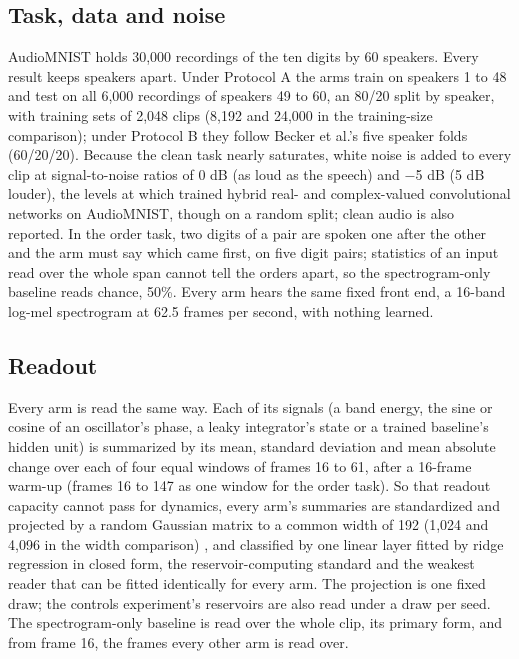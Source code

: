 \documentclass[10pt]{article}
\begin{document}
\subsection{Task, data and noise}\label{task-data-and-noise}

AudioMNIST \citep{becker2024} holds 30,000 recordings of the ten digits
by 60 speakers. Every result keeps speakers apart. Under Protocol A the
arms train on speakers 1 to 48 and test on all 6,000 recordings of
speakers 49 to 60, an 80/20 split by speaker, with training sets of
2,048 clips (8,192 and 24,000 in the training-size comparison); under
Protocol B they follow Becker et al.'s five speaker folds (60/20/20).
Because the clean task nearly saturates, white noise is added to every
clip at signal-to-noise ratios of 0 dB (as loud as the speech) and
\ensuremath{-}5 dB (5 dB louder), the levels at which \citet{young2026}
trained hybrid real- and complex-valued convolutional networks on
AudioMNIST, though on a random split; clean audio is also reported. In
the order task, two digits of a pair are spoken one after the other and
the arm must say which came first, on five digit pairs; statistics of an
input read over the whole span cannot tell the orders apart, so the
spectrogram-only baseline reads chance, 50\%. Every arm hears the same
fixed front end, a 16-band log-mel spectrogram at 62.5 frames per
second, with nothing learned.

\subsection{Readout}\label{readout}

Every arm is read the same way. Each of its signals (a band energy, the
sine or cosine of an oscillator's phase, a leaky integrator's state or a
trained baseline's hidden unit) is summarized by its mean, standard
deviation and mean absolute change over each of four equal windows of
frames 16 to 61, after a 16-frame warm-up (frames 16 to 147 as one
window for the order task). So that readout capacity cannot pass for
dynamics, every arm's summaries are standardized and projected by a
random Gaussian matrix to a common width of 192 (1,024 and 4,096 in the
width comparison) \citep{johnson1984}, and classified by one linear
layer fitted by ridge regression in closed form, the reservoir-computing
standard \citep{jaeger2001, lukosevicius2012} and the weakest reader
that can be fitted identically for every arm. The projection is one
fixed draw; the controls experiment's reservoirs are also read under a
draw per seed. The spectrogram-only baseline is read over the whole
clip, its primary form, and from frame 16, the frames every other arm is
read over.
\end{document}
